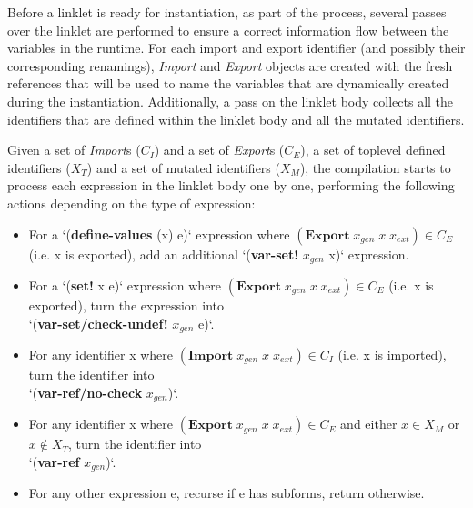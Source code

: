			\begin{paragraph-here}
				Before a linklet is ready for instantiation, as part of the
				 process, several passes over the linklet are
				performed to ensure a correct information flow between the variables
				in the run\dash time. For each import and export identifier (and
				possibly their corresponding renamings), \emph{Import} and
				\emph{Export} objects are created with the fresh references that
				will be used to name the variables that are dynamically created during
				the instantiation. Additionally, a pass on the linklet body collects
				all the identifiers that are defined within the linklet body and all
				the mutated identifiers.
			\end{paragraph-here}



			\begin{paragraph-here}
				Given a set of \emph{Import}s ($\mathit{C_I}$) and a set of
				\emph{Export}s ($\mathit{C_E}$), a set of toplevel defined
				identifiers ($\mathit{X_T}$) and a set of mutated identifiers
				($\mathit{X_M}$), the compilation starts to process each expression in
				the linklet body one by one, performing the following actions
				depending on the type of expression:

			\end{paragraph-here}

			\begin{itemize}
			\small
			\item For a `(\textbf{define-values} (x) e)` expression where $(\textbf{Export}\; x_{gen}\; x\; x_{ext}) \in \mathit{C_E}$ (i.e. x is exported), add an additional `(\textbf{var-set!} $x_{gen}$ x)` expression.
			\item For a `(\textbf{set!} x e)` expression where $(\textbf{Export}\; x_{gen}\; x\; x_{ext}) \in \mathit{C_E}$ (i.e. x is exported), turn the expression into \\ `(\textbf{var-set/check-undef!} $x_{gen}$ e)`.
			\item For any identifier x where $(\textbf{Import}\; x_{gen}\; x\; x_{ext}) \in \mathit{C_I}$  (i.e. x is imported), turn the identifier into \\ `(\textbf{var-ref/no-check} $x_{gen}$)`.
			\item For any identifier x where $(\textbf{Export}\; x_{gen}\; x\; x_{ext}) \in \mathit{C_E}$ and either $x \in \mathit{X_M}$ or $x \notin \mathit{X_T}$, turn the identifier into \\ `(\textbf{var-ref} $x_{gen}$)`.
			\item For any other expression e, recurse if e has subforms, return otherwise.
			\end{itemize}

